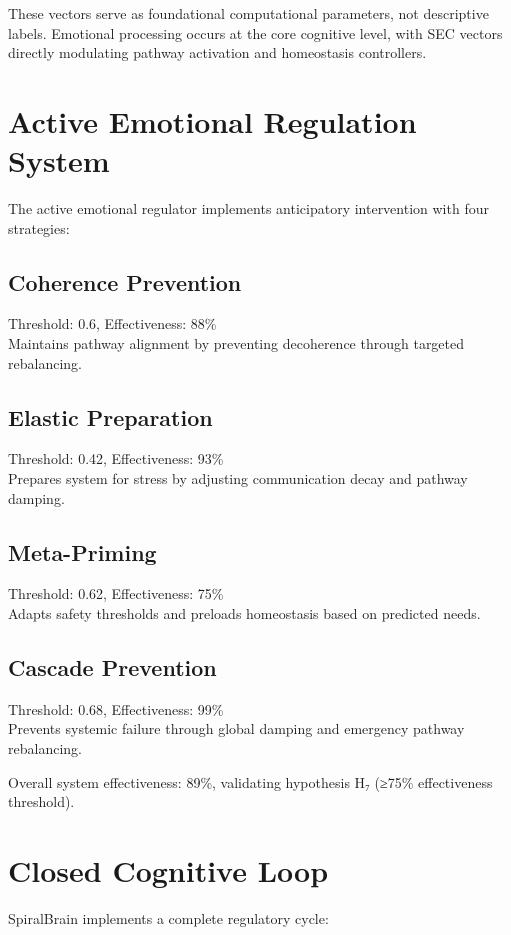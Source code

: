 \documentclass[12pt,a4paper]{report}
\begin{document}
These vectors serve as foundational computational parameters, not descriptive labels. Emotional processing occurs at the core cognitive level, with SEC vectors directly modulating pathway activation and homeostasis controllers.

\section{Active Emotional Regulation System}

The active emotional regulator implements anticipatory intervention with four strategies:

\subsection{Coherence Prevention}
Threshold: 0.6, Effectiveness: 88\% \\
Maintains pathway alignment by preventing decoherence through targeted rebalancing.

\subsection{Elastic Preparation}
Threshold: 0.42, Effectiveness: 93\% \\
Prepares system for stress by adjusting communication decay and pathway damping.

\subsection{Meta-Priming}
Threshold: 0.62, Effectiveness: 75\% \\
Adapts safety thresholds and preloads homeostasis based on predicted needs.

\subsection{Cascade Prevention}
Threshold: 0.68, Effectiveness: 99\% \\
Prevents systemic failure through global damping and emergency pathway rebalancing.

Overall system effectiveness: 89\%, validating hypothesis H₇ (≥75\% effectiveness threshold).

\section{Closed Cognitive Loop}

SpiralBrain implements a complete regulatory cycle:
\end{document}
